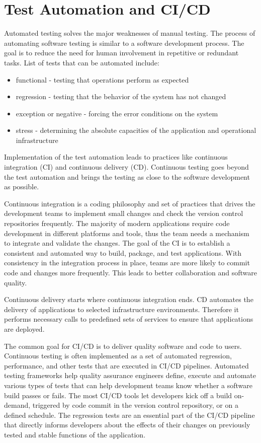 \section{Test Automation and CI/CD}
Automated testing solves the major weaknesses of manual testing. The process of automating software testing is similar to a software development process. The goal is to reduce the need for human involvement in repetitive or redundant tasks. List of tests that can be automated include\cite{ci_tests}:
\begin{itemize}
    \item functional - testing that operations perform as expected
    \item regression - testing that the behavior of the system has not changed
    \item exception or negative - forcing the error conditions on the system
    \item stress - determining the absolute capacities of the application and operational infrastructure
\end{itemize}

Implementation of the test automation leads to practices like continuous integration (CI) and continuous delivery (CD). Continuous testing goes beyond the test automation and brings the testing as close to the software development as possible.

Continuous integration is a coding philosophy and set of practices that drives the development teams to implement small changes and check the version control repositories frequently. The majority of modern applications require code development in different platforms and tools, thus the team needs a mechanism to integrate and validate the changes. The goal of the CI is to establish a consistent and automated way to build, package, and test applications. With consistency in the integration process in place, teams are more likely to commit code and changes more frequently. This leads to better collaboration and software quality.

Continuous delivery starts where continuous integration ends. CD automates the delivery of applications to selected infrastructure environments. Therefore it performs necessary calls to predefined sets of services to ensure that applications are deployed.

The common goal for CI/CD is to deliver quality software and code to users. Continuous testing is often implemented as a set of automated regression, performance, and other tests that are executed in CI/CD pipelines. Automated testing frameworks help quality assurance engineers define, execute and automate various types of tests that can help development teams know whether a software build passes or fails. The most CI/CD tools let developers kick off a build on-demand, triggered by code commit in the version control repository, or on a defined schedule. The regression tests are an essential part of the CI/CD pipeline that directly informs developers about the effects of their changes on previously tested and stable functions of the application.\cite{CI}  


